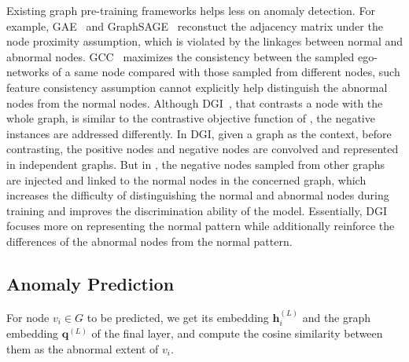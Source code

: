 {
Existing graph pre-training frameworks helps less on anomaly detection. For example,  GAE~\cite{GAE} and GraphSAGE~\cite{Graphsage} reconstuct the adjacency matrix under the node proximity assumption, which is violated by the linkages between normal and abnormal nodes. 
GCC~\cite{qiu2020gcc} maximizes the consistency between the sampled ego-networks of a same node compared with those sampled from different nodes, such feature consistency assumption cannot explicitly help distinguish the abnormal nodes from the normal nodes. 
Although DGI~\cite{velickovic2019deep}, that contrasts a node with the whole graph, is similar to the contrastive objective function of \pmodel, the negative instances are addressed differently. In DGI, given a graph as the context, before contrasting, the positive nodes and negative nodes are convolved and represented in independent graphs. But in \pmodel, the negative nodes sampled from other graphs are injected and linked to the normal nodes in the concerned graph, which increases the difficulty of distinguishing the normal and abnormal nodes during training and improves the discrimination ability of the model. Essentially, DGI focuses more on representing the normal pattern while \spmodel additionally reinforce the differences of the abnormal nodes from the normal pattern.



\subsection{Anomaly Prediction}
For node $v_i \in G$ to be predicted, we get its embedding $\boldsymbol{h}_i^{(L)}$ and the graph embedding $\boldsymbol{q}^{(L)}$ of the final layer, and compute the cosine similarity between them as the abnormal extent of $v_i$. 


}